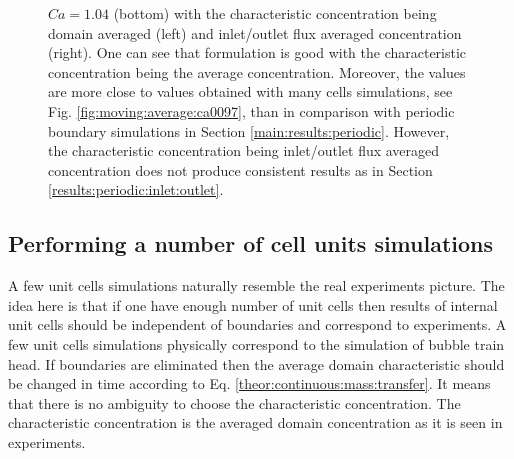 \documentclass{article}
\begin{document}
\begin{figure}
{$Ca=1.04$ (bottom) with the characteristic concentration being domain
averaged (left) and inlet/outlet flux averaged concentration (right). One can
see that \citet{vanbaten-circular} formulation is good with the characteristic concentration being
the average concentration. Moreover, the values are more close to values obtained with many cells
simulations, see Fig. \ref{fig:moving:average:ca0097}, than in comparison with periodic boundary
simulations in Section \ref{main:results:periodic}. However, the characteristic concentration
being inlet/outlet flux averaged concentration does not produce consistent results as in Section
\ref{results:periodic:inlet:outlet}.
\label{fig:vanbaten}}
\end{figure}


\subsection{Performing a number of cell units simulations}
A few unit cells simulations naturally resemble the real experiments picture.  The idea here is
that if one have enough number of unit cells then results of internal unit cells should be
independent of boundaries and correspond to experiments. A few unit cells simulations physically
correspond to the simulation of bubble train head. If boundaries are eliminated then the average
domain characteristic should be changed in time according to Eq.
\ref{theor:continuous:mass:transfer}. It means that there is no ambiguity to choose the
characteristic concentration. The characteristic concentration is the averaged domain concentration
as it is seen in experiments.
\end{document}
